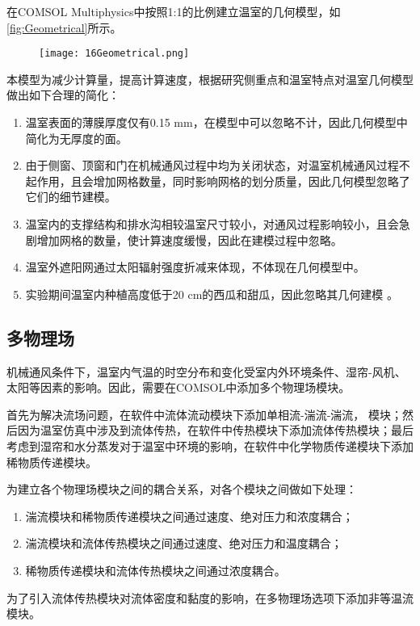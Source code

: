 在COMSOL Multiphysics中按照1:1的比例建立温室的几何模型，如\ref{fig:Geometrical}所示。
	\begin{figure}[!htp]
		\centering
		\texttt{[image: 16Geometrical.png]}
	\end{figure}
本模型为减少计算量，提高计算速度，根据研究侧重点和温室特点对温室几何模型做出如下合理的简化：
	\begin{enumerate}
		\item 温室表面的薄膜厚度仅有0.15 mm，在模型中可以忽略不计，因此几何模型中简化为无厚度的面。
		\item 由于侧窗、顶窗和门在机械通风过程中均为关闭状态，对温室机械通风过程不起作用，且会增加网格数量，同时影响网格的划分质量，因此几何模型忽略了它们的细节建模。
		\item 温室内的支撑结构和排水沟相较温室尺寸较小，对通风过程影响较小，且会急剧增加网格的数量，使计算速度缓慢，因此在建模过程中忽略。
		\item 温室外遮阳网通过太阳辐射强度折减来体现，不体现在几何模型中。
		\item 实验期间温室内种植高度低于20 cm的西瓜和甜瓜，因此忽略其几何建模\supercite{HeKeshi2012,RenShougang2015} 。
	\end{enumerate}
	
	\subsection{多物理场}
	机械通风条件下，温室内气温的时空分布和变化受室内外环境条件、湿帘-风机、太阳等因素的影响。因此，需要在COMSOL中添加多个物理场模块。
	
首先为解决流场问题，在软件中流体流动模块下添加单相流-湍流-湍流， 模块；然后因为温室仿真中涉及到流体传热，在软件中传热模块下添加流体传热模块；最后考虑到湿帘和水分蒸发对于温室中环境的影响，在软件中化学物质传递模块下添加稀物质传递模块。

为建立各个物理场模块之间的耦合关系，对各个模块之间做如下处理：
	\begin{enumerate}
		\item 湍流模块和稀物质传递模块之间通过速度、绝对压力和浓度耦合；
		\item 湍流模块和流体传热模块之间通过速度、绝对压力和温度耦合；
		\item 稀物质传递模块和流体传热模块之间通过浓度耦合。
	\end{enumerate}
为了引入流体传热模块对流体密度和黏度的影响，在多物理场选项下添加非等温流模块。

